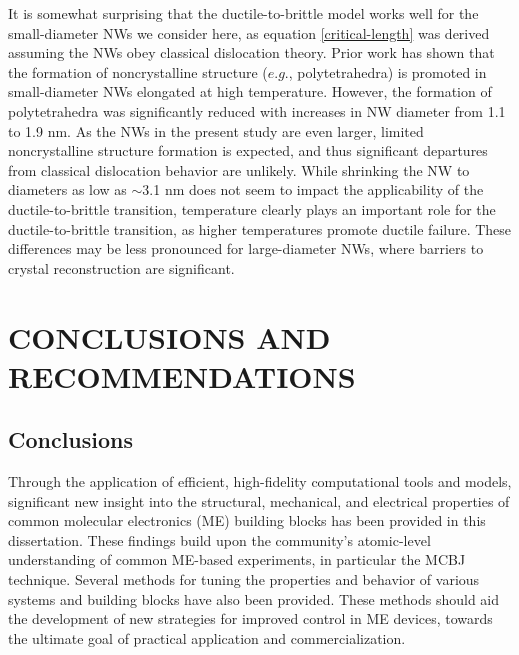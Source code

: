 \documentclass[10pt]{report}  %
\newcommand\findent{\hspace*{\parindent}}
\begin{document}
It is somewhat surprising that the ductile-to-brittle model works well for the small-diameter NWs we consider here, as equation \ref{critical-length} was derived assuming the NWs obey classical dislocation theory. Prior work \cite{Iacovella:2011} has shown that the formation of noncrystalline structure ($e.g.$, polytetrahedra)  is promoted in small-diameter NWs elongated at high temperature. However, the formation of polytetrahedra was significantly reduced with increases in NW diameter from 1.1 to 1.9 nm. As the NWs in the present study are even larger, limited noncrystalline structure formation is expected, and thus significant departures from classical dislocation behavior are unlikely. While shrinking the NW to diameters as low as $\sim$3.1 nm does not seem to impact the applicability of the ductile-to-brittle transition, temperature clearly plays an important role for the ductile-to-brittle transition, as higher temperatures promote ductile failure. These differences may be less pronounced for large-diameter NWs, where barriers to crystal reconstruction are significant.





%
%
%
%
\chapter{CONCLUSIONS AND RECOMMENDATIONS}

\section{Conclusions}

\findent Through the application of efficient, high-fidelity computational tools and models, significant new insight into the structural, mechanical, and electrical properties of common molecular electronics (ME) building blocks has been provided in this dissertation. These findings build upon the community's atomic-level understanding of common ME-based experiments, in particular the MCBJ technique. Several methods for tuning the properties and behavior of various systems and building blocks have also been provided. These methods should aid the development of new strategies for improved control in ME devices, towards the ultimate goal of practical application and commercialization. 
\end{document}
